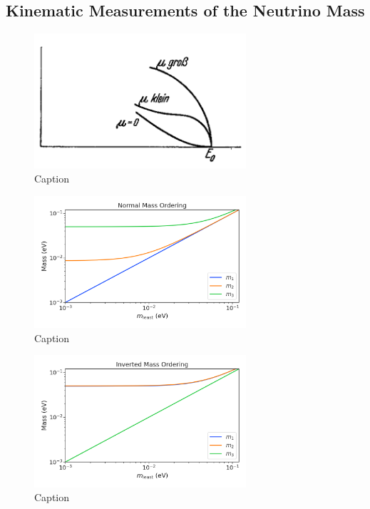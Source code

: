 \subsection{Kinematic Measurements of the Neutrino Mass}

\begin{figure}[htbp]
    \centering
    \includegraphics[width=0.7\textwidth]{figs/Chapter-2/Fermi.png}
    \caption{Caption}
    \label{fig:fermi_original_b_spectrum}
\end{figure}

\begin{figure}[htbp]
    \centering
    \includegraphics[width=0.7\textwidth]{figs/Chapter-2/230302_mass_estate_vals_normal.png}
    \caption{Caption}
    \label{fig:mass_estates_normal}
\end{figure}

\begin{figure}[htbp]
    \centering
    \includegraphics[width=0.7\textwidth]{figs/Chapter-2/230302_mass_estate_vals_inverted.png}
    \caption{Caption}
    \label{fig:mass_estates_inverted}
\end{figure}

